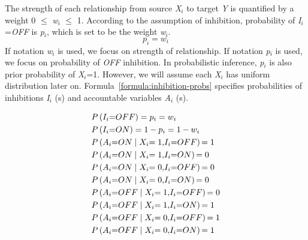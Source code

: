 \documentclass{article}
\numberwithin{equation}{section}
\numberwithin{figure}{section}
\numberwithin{table}{section}
\begin{document}
The strength of each relationship from source \textit{X${}_{i}$} to target \textit{Y} is quantified by a weight 0 $\mathrm{\le}$ \textit{w${}_{i}$} $\mathrm{\le}$ 1. According to the assumption of inhibition, probability of \textit{I${}_{i}$}=\textit{OFF} is \textit{p${}_{i}$}, which is set to be the weight \textit{w${}_{i}$}.
\[p_i=w_i\] 
If notation \textit{w${}_{i}$} is used, we focus on strength of relationship. If notation \textit{p${}_{i}$} is used, we focus on probability of \textit{OFF} inhibition. In probabilistic inference, \textit{p${}_{i}$} is also prior probability of \textit{X${}_{i}$}=1. However, we will assume each \textit{X${}_{i}$} has uniform distribution later on. Formula~\ref{formula:inhibition-probs} specifies probabilities of inhibitions \textit{I${}_{i}$} (s) and accountable variables \textit{A${}_{i}$} (s).

\begin{equation}
\begin{split}
&P\left(I_i\mathrm{=}OFF\right)=p_i=w_i\\
&P\left(I_i\mathrm{=}ON\right)=1-p_i=1-w_i\\
&P\left(A_i\mathrm{=}ON\mathrel{\left|\vphantom{A_i\mathrm{=}ON X_i\mathrm{=1,}I_i\mathrm{=}OFF}\right.\kern-\nulldelimiterspace}X_i\mathrm{=1,}I_i\mathrm{=}OFF\right)\mathrm{=1}\\
&P\left(A_i\mathrm{=}ON\mathrel{\left|\vphantom{A_i\mathrm{=}ON X_i\mathrm{=1,}I_i\mathrm{=}ON}\right.\kern-\nulldelimiterspace}X_i\mathrm{=1,}I_i\mathrm{=}ON\right)\mathrm{=0}\\
&P\left(A_i\mathrm{=}ON\mathrel{\left|\vphantom{A_i\mathrm{=}ON X_i\mathrm{=0,}I_i\mathrm{=}OFF}\right.\kern-\nulldelimiterspace}X_i\mathrm{=0,}I_i\mathrm{=}OFF\right)\mathrm{=0}\\
&P\left(A_i\mathrm{=}ON\mathrel{\left|\vphantom{A_i\mathrm{=}ON X_i\mathrm{=0,}I_i\mathrm{=}ON}\right.\kern-\nulldelimiterspace}X_i\mathrm{=0,}I_i\mathrm{=}ON\right)\mathrm{=0}\\
&P\left(A_i\mathrm{=}OFF\mathrel{\left|\vphantom{A_i\mathrm{=}OFF X_i\mathrm{=1,}I_i\mathrm{=}OFF}\right.\kern-\nulldelimiterspace}X_i\mathrm{=1,}I_i\mathrm{=}OFF\right)\mathrm{=0}\\
&P\left(A_i\mathrm{=}OFF\mathrel{\left|\vphantom{A_i\mathrm{=}OFF X_i\mathrm{=1,}I_i\mathrm{=}ON}\right.\kern-\nulldelimiterspace}X_i\mathrm{=1,}I_i\mathrm{=}ON\right)\mathrm{=1}\\
&P\left(A_i\mathrm{=}OFF\mathrel{\left|\vphantom{A_i\mathrm{=}OFF X_i\mathrm{=0,}I_i\mathrm{=}OFF}\right.\kern-\nulldelimiterspace}X_i\mathrm{=0,}I_i\mathrm{=}OFF\right)\mathrm{=1}\\
&P\left(A_i\mathrm{=}OFF\mathrel{\left|\vphantom{A_i\mathrm{=}OFF X_i\mathrm{=0,}I_i\mathrm{=}ON}\right.\kern-\nulldelimiterspace}X_i\mathrm{=0,}I_i\mathrm{=}ON\right)\mathrm{=1}
\end{split}
\label{formula:inhibition-probs}
\end{equation} 
\end{document}
